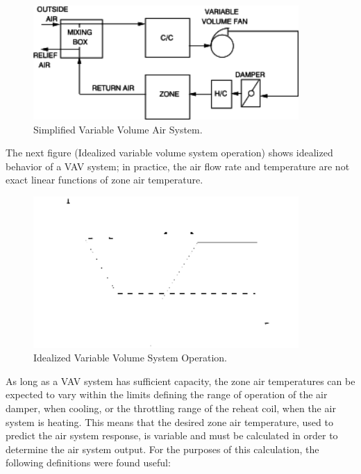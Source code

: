 \begin{figure}[hbtp] %
\centering
\includegraphics[width=0.9\textwidth, height=0.9\textheight, keepaspectratio=true]{media/image33.svg.png}
\caption{Simplified Variable Volume Air System. \protect \label{fig:simplified-variable-volume-air-system.}}
\end{figure}

The next figure (Idealized variable volume system operation) shows idealized behavior of a VAV system; in practice, the air flow rate and temperature are not exact linear functions of zone air temperature.

\begin{figure}[hbtp] %
\centering
\includegraphics[width=0.9\textwidth, height=0.9\textheight, keepaspectratio=true]{media/image34.svg.png}
\caption{Idealized Variable Volume System Operation. \protect \label{fig:idealized-variable-volume-system-operation.}}
\end{figure}

As long as a VAV system has sufficient capacity, the zone air temperatures can be expected to vary within the limits defining the range of operation of the air damper, when cooling, or the throttling range of the reheat coil, when the air system is heating. This means that the desired zone air temperature, used to predict the air system response, is variable and must be calculated in order to determine the air system output. For the purposes of this calculation, the following definitions were found useful:


